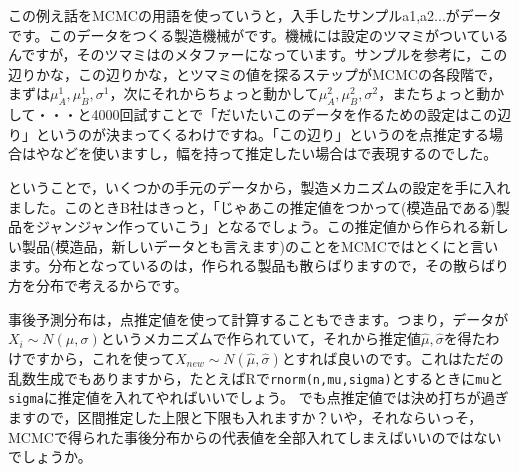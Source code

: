 \documentclass{ltjsbook}
\begin{document}
この例え話をMCMCの用語を使っていうと，入手したサンプルa1,a2...がデータです。このデータをつくる製造機械がです。機械には設定のツマミがついているんですが，そのツマミはのメタファーになっています。サンプルを参考に，この辺りかな，この辺りかな，とツマミの値を探るステップがMCMCの各段階で，まずは$\mu_A^1,\mu_B^1,\sigma^1$，次にそれからちょっと動かして$\mu_A^2,\mu_B^2,\sigma^2$，またちょっと動かして・・・と4000回試すことで「だいたいこのデータを作るための設定はこの辺り」というのが決まってくるわけですね。「この辺り」というのを点推定する場合はやなどを使いますし，幅を持って推定したい場合はで表現するのでした。

ということで，いくつかの手元のデータから，製造メカニズムの設定を手に入れました。このときB社はきっと，「じゃあこの推定値をつかって(模造品である)製品をジャンジャン作っていこう」となるでしょう。この推定値から作られる新しい製品(模造品，新しいデータとも言えます)のことをMCMCではとくにと言います。分布となっているのは，作られる製品も散らばりますので，その散らばり方を分布で考えるからです。

事後予測分布は，点推定値を使って計算することもできます。つまり，データが$X_{i}\sim N(\mu,\sigma)$というメカニズムで作られていて，それから推定値$\hat{\mu},\hat{\sigma}$を得たわけですから，これを使って$X_{new}\sim N(\hat{\mu},\hat{\sigma})$とすれば良いのです。これはただの乱数生成でもありますから，たとえばRで\verb|rnorm(n,mu,sigma)|とするときに\verb|mu|と\verb|sigma|に推定値を入れてやればいいでしょう。
でも点推定値では決め打ちが過ぎますので，区間推定した上限と下限も入れますか？いや，それならいっそ，MCMCで得られた事後分布からの代表値を全部入れてしまえばいいのではないでしょうか。
\end{document}
